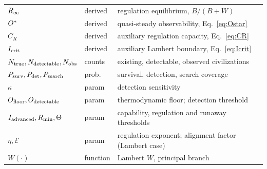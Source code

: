 \begin{center}
\begin{tabular}{@{}llL{7.6cm}@{}}
$R_\infty$ & derived & regulation equilibrium, $B/(B+W)$ \\
$O^{*}$    & derived & quasi-steady observability, Eq.~\eqref{eq:Ostar} \\
$C_R$         & derived & auxiliary regulation capacity, Eq.~\eqref{eq:CR} \\
$I_{\mathrm{crit}}$      & derived & auxiliary Lambert boundary, Eq.~\eqref{eq:Icrit} \\
\midrule
$N_{\mathrm{true}},N_{\mathrm{detectable}},N_{\mathrm{obs}}$ & counts & existing, detectable, observed civilizations \\
$P_{\mathrm{surv}},P_{\mathrm{det}},P_{\mathrm{search}}$ & prob. & survival, detection, search coverage \\
$\kappa$      & param & detection sensitivity \\
$O_{\mathrm{floor}},O_{\mathrm{detectable}}$ & param & thermodynamic floor; detection threshold \\
$I_{\mathrm{advanced}},R_{\mathrm{min}},\Theta$ & param & capability, regulation and runaway thresholds \\
$\eta,\mathcal{E}$ & param & regulation exponent; alignment factor (Lambert case) \\
$W(\cdot)$    & function & Lambert $W$, principal branch \\
\bottomrule
\end{tabular}
\end{center}
